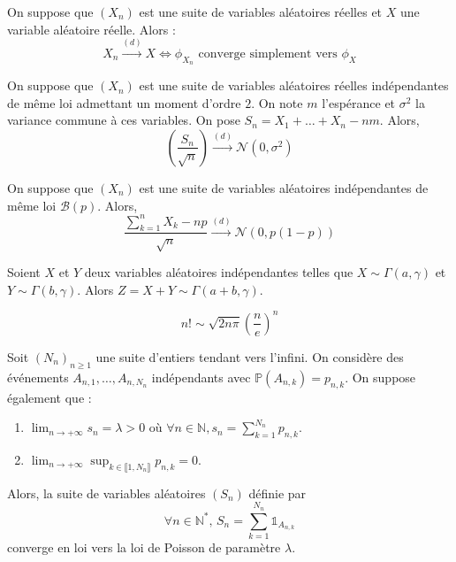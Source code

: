 
  \begin{theorem}
    On suppose que $(X_n)$ est une suite de variables aléatoires réelles et $X$ une variable aléatoire réelle. Alors :
    \[ X_n \overset{(d)}{\longrightarrow} X \iff \phi_{X_n} \text{ converge simplement vers } \phi_X \]
  \end{theorem}


  \begin{theorem}
    On suppose que $(X_n)$ est une suite de variables aléatoires réelles indépendantes de même loi admettant un moment d'ordre $2$. On note $m$ l'espérance et $\sigma^2$ la variance commune à ces variables. On pose $S_n = X_1 + \dots + X_n - nm$. Alors,
    \[ \left ( \frac{S_n}{\sqrt{n}} \right) \overset{(d)}{\longrightarrow} \mathcal{N}(0, \sigma^2) \]
  \end{theorem}

  \begin{application}
    On suppose que $(X_n)$ est une suite de variables aléatoires indépendantes de même loi $\mathcal{B}(p)$. Alors,
    \[ \frac{\sum_{k=1}^{n} X_k - np}{\sqrt{n}} \overset{(d)}{\longrightarrow} \mathcal{N}(0, p(1-p)) \]
  \end{application}


  \begin{lemma}
    Soient $X$ et $Y$ deux variables aléatoires indépendantes telles que $X \sim \Gamma(a, \gamma)$ et $Y \sim \Gamma(b, \gamma)$. Alors $Z = X + Y \sim \Gamma(a+b, \gamma)$.
  \end{lemma}


  \begin{application}
    \[ n! \sim \sqrt{2n\pi} \left(\frac{n}{e} \right)^n \]
  \end{application}


  \begin{application}
    Soit $(N_n)_{n \geq 1}$ une suite d'entiers tendant vers l'infini. On considère des événements $A_{n,1}, \dots, A_{n,N_n}$ indépendants avec $\mathbb{P}(A_{n,k}) = p_{n,k}$. On suppose également que :
    \begin{enumerate}[label={\bfseries(\roman*)}]
      \item $\lim_{n \rightarrow +\infty} s_n = \lambda > 0$ où $\forall n \in \mathbb{N}, s_n = \sum_{k=1}^{N_n} p_{n,k}$.
      \item $\lim_{n \rightarrow +\infty} \sup_{k \in \llbracket 1, N_n \rrbracket} p_{n,k} = 0$.
    \end{enumerate}
    Alors, la suite de variables aléatoires $(S_n)$ définie par
    \[ \forall n \in \mathbb{N}^*, \, S_n = \sum_{k=1}^{N_n} \mathbb{1}_{A_{n,k}} \]
    converge en loi vers la loi de Poisson de paramètre $\lambda$.
  \end{application}


